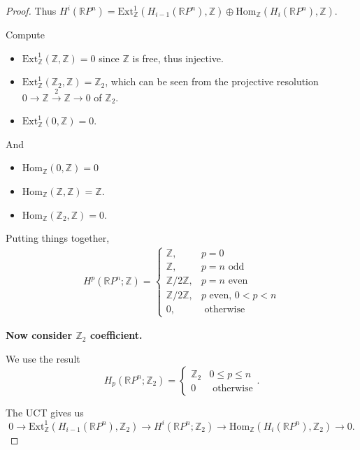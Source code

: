 \begin{enumerate}
\begin{proof}
Thus $H^i(\mathbb{R} P^n) = \text{Ext}^1_{\mathbb{Z}}(H_{i - 1}(\mathbb{R} P^n), \mathbb{Z}) \oplus \text{Hom}_{\mathbb{Z}} (H_i(\mathbb{R}P^n), \mathbb{Z})$.

Compute
\begin{itemize}
	\item $\text{Ext}^1_{\mathbb{Z}}(\mathbb{Z}, \mathbb{Z}) = 0$ since $\mathbb{Z}$ is free, thus injective.
	\item  $\text{Ext}^1_{\mathbb{Z}}(\mathbb{Z}_2, \mathbb{Z}) = \mathbb{Z}_2$, which can be seen from the projective resolution $0 \to \mathbb{Z} \xrightarrow{2} \mathbb{Z} \to 0$ of $\mathbb{Z}_2$.
	\item $\text{Ext}^1_{\mathbb{Z}}(0,\mathbb{Z}) = 0$.
\end{itemize}
And
\begin{itemize}
	\item $\text{Hom}_{\mathbb{Z}}(0, \mathbb{Z}) = 0$
	\item $\text{Hom}_{\mathbb{Z}}(\mathbb{Z}, \mathbb{Z}) = \mathbb{Z}$.
	\item $\text{Hom}_{\mathbb{Z}}(\mathbb{Z}_2, \mathbb{Z}) = 0$.
\end{itemize}

Putting things together,
\begin{align}
H^p\left(\mathbb{R} P^n ; \mathbb{Z}\right)=\left\{\begin{aligned}
\mathbb{Z}, & p=0 \\
\mathbb{Z}, & p=n \text{ odd} \\
\mathbb{Z} / 2 \mathbb{Z}, & p=n \text{ even} \\
\mathbb{Z} / 2 \mathbb{Z}, & p \text { even, } 0<p<n \\
0, & \text { otherwise }
\end{aligned}\right.
\end{align}

\textbf{Now consider $\mathbb{Z}_2$ coefficient.} 

We use the result
\[
	H_p\left( \mathbb{R}P^n; \mathbb{Z}_2 \right) = 
	\begin{cases}
		\mathbb{Z}_2 & 0 \le p \le n \\
		0 & \text{ otherwise}
	\end{cases}
.\] 

The UCT gives us
\[
	0 \to \text{Ext}^1_{\mathbb{Z}}(H_{i - 1}(\mathbb{R} P^n), \mathbb{Z}_2) \to H^i(\mathbb{R} P^n; \mathbb{Z}_2) \to \text{Hom}_{\mathbb{Z}} (H_i(\mathbb{R}P^n), \mathbb{Z}_2) \to 0
.\]


\end{proof}
\end{enumerate}

